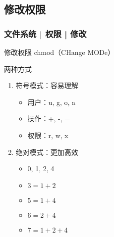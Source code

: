 \subsection{修改权限}
\begin{frame}
  \frametitle{文件系统 | 权限 | \alert{修改}}
  \begin{block}{修改权限}
    chmod（CHange MODe）
  \end{block}
  \pause
  \begin{block}{两种方式}
    \begin{enumerate}
      \item 符号模式：容易理解
        \begin{itemize}
          \item 用户：u, g, o, a
          \item 操作：+, -, =
	  \item 权限：r, w, x
        \end{itemize}
      \item 绝对模式：更加高效
        \begin{itemize}
          \item 0, 1, 2, 4
          \item $3 = 1 + 2$
          \item $5 = 1 + 4$
          \item $6 = 2 + 4$
          \item $7 = 1 + 2 + 4$
        \end{itemize}
    \end{enumerate}
  \end{block}
\end{frame}

